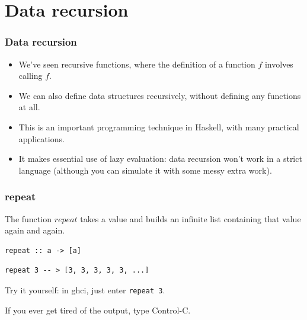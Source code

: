\documentclass{beamer}
\begin{document}
\section{Data recursion}

\begin{frame}[fragile]
\frametitle{Data recursion}

\begin{itemize}
\item We've seen recursive functions, where the definition of a
  function $f$ involves calling $f$.
\item We can also define data structures recursively, without
  defining any functions at all.
\item This is an important programming technique in Haskell, with
  many practical applications.
\item It makes essential use of lazy evaluation: data recursion
  won't work in a strict language (although you can simulate it
  with some messy extra work).
\end{itemize}

\end{frame}

\begin{frame}[fragile]
\frametitle{repeat}

The function $repeat$ takes a value and builds an infinite list
containing that value again and again.

\begin{verbatim}
repeat :: a -> [a]
\end{verbatim}

\begin{verbatim}
repeat 3 -- > [3, 3, 3, 3, 3, ...]
\end{verbatim}

Try it yourself: in ghci, just enter {\tt repeat 3}.

\vspace{1em}

If you ever get tired of the output, type Control-C.

\end{frame}
\end{document}
